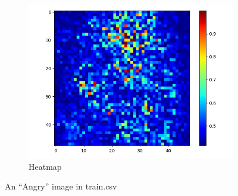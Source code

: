 \documentclass[12pt,a4paper]{extarticle}
\begin{document}
\begin{enumerate}
\begin{figure}[ht]
\begin{subfigure}[t]{0.32\textwidth}
      \includegraphics[width=\linewidth]{images/heatmap-10.png}
      \caption{Heatmap}
      \label{fig:heatmap-10}
    \end{subfigure}
    \caption{An ``Angry'' image in train.csv}
    \label{fig:image-10-comparison}
  \end{figure}


\end{enumerate}
\end{document}
